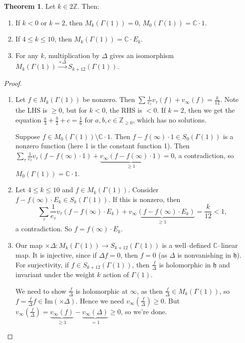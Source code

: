 \documentclass{article}
\theoremstyle{definition}
\newtheorem{theorem}{Theorem}[section]
\begin{document}
\begin{theorem}
    Let $k \in 2\mathbb{Z}$. Then:
    \begin{enumerate}[(1)]
        \item If $k<0$ or $k=2$, then $M_k(\Gamma(1)) = 0$, $M_0(\Gamma(1)) = \mathbb{C} \cdot 1$.
        \item If $4\le k\le 10$, then $M_k(\Gamma(1)) = \mathbb{C} \cdot E_k$. 
        \item For any $k$, multiplication by $\Delta$ gives an isomorphism $M_k(\Gamma(1)) \stackrel{\times \Delta}{\to}  S_{k+12}(\Gamma(1))$.
    \end{enumerate}
\end{theorem}
\begin{proof}
    \begin{enumerate}[(1)]
        \item Let $f \in M_k(\Gamma(1))$ be nonzero. Then $\sum_{}^{} \frac{1}{e_{\tau}}v_{\tau}(f) + v_{\infty}(f) = \frac{k}{12}$. Note the LHS is $\ge 0$, but for $k<0$, the RHS is $<0$. If $k=2$, then we get the equation $\frac{a}{3}+\frac{b}{2}+c = \frac{1}{6}$ for $a,b,c \in \mathbb{Z}_{\ge 0}$, which has no solutions.
        \vspace{1mm}
         
        Suppose $f \in M_0(\Gamma(1)) \setminus \mathbb{C}\cdot 1$. Then $f - f(\infty) \cdot 1  \in S_0(\Gamma(1))$ is a nonzero function (here 1 is the constant function 1). Then $\sum_{\tau}^{} \frac{1}{e_{\tau}}v_{\tau}(f-f(\infty)\cdot 1) + \underbrace{v_{\infty}(f-f(\infty)\cdot 1)}_{\ge 1} = 0$, a contradiction, so $M_0(\Gamma(1)) = \mathbb{C}\cdot 1$.
        \item Let $4\le k\le 10$ and $f \in M_k(\Gamma(1))$. Consider $f - f(\infty)\cdot E_k \in S_k(\Gamma(1))$. If this is nonzero, then \[
        \sum_{\tau}^{} \frac{1}{e_\tau}v_{\tau}(f-f(\infty)\cdot E_k) + \underbrace{v_{\infty}(f-f(\infty)\cdot E_k)}_{\ge 1} = \frac{k}{12}<1,
        \]
        a contradiction. So $f = f(\infty)\cdot E_k$.
        \item Our map $\times \Delta : M_k(\Gamma(1)) \to S_{k+12}(\Gamma(1))$ is a well--defined $\mathbb{C}$--linear map. It is injective, since if $\Delta f = 0$, then $f = 0$ (as $\Delta$ is nonvanishing in $\mathfrak{h}$). For surjectivity, if $f \in S_{k+12}(\Gamma(1))$, then $\frac{f}{\Delta}$ is holomorphic in $\mathfrak{h}$ and invariant under the weight $k$ action of $\Gamma(1)$. 
        \vspace{1mm}
         
        We need to show $\frac{f}{\Delta}$ is holomorphic at $\infty$, as then $\frac{f}{\Delta} \in M_k(\Gamma(1))$, so $f = \frac{f}{\Delta}f \in \text{Im}(\times \Delta)$. Hence we need $v_{\infty}\left(\frac{f}{\Delta}\right) \ge 0$. But $v_{\infty}\left(\frac{f}{\Delta}\right) = \underbrace{v_{\infty}(f)}_{\ge 1} - \underbrace{v_{\infty}(\Delta)}_{=1} \ge 0$, so we're done.
    \end{enumerate}
\end{proof}
\end{document}

